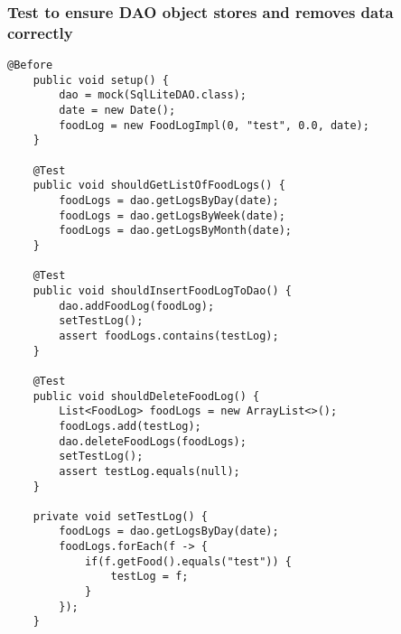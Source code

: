 \subsubsection*{Test to ensure DAO object stores and removes data correctly}
\begin{lstlisting}[style=Java]
	@Before
    public void setup() {
        dao = mock(SqlLiteDAO.class);
        date = new Date();
        foodLog = new FoodLogImpl(0, "test", 0.0, date);
    }

    @Test
    public void shouldGetListOfFoodLogs() {
        foodLogs = dao.getLogsByDay(date);
        foodLogs = dao.getLogsByWeek(date);
        foodLogs = dao.getLogsByMonth(date);
    }

    @Test
    public void shouldInsertFoodLogToDao() {
        dao.addFoodLog(foodLog);
        setTestLog();
        assert foodLogs.contains(testLog);
    }

    @Test
    public void shouldDeleteFoodLog() {
        List<FoodLog> foodLogs = new ArrayList<>();
        foodLogs.add(testLog);
        dao.deleteFoodLogs(foodLogs);
        setTestLog();
        assert testLog.equals(null);
    }

    private void setTestLog() {
        foodLogs = dao.getLogsByDay(date);
        foodLogs.forEach(f -> {
            if(f.getFood().equals("test")) {
                testLog = f;
            }
        });
    }
\end{lstlisting}